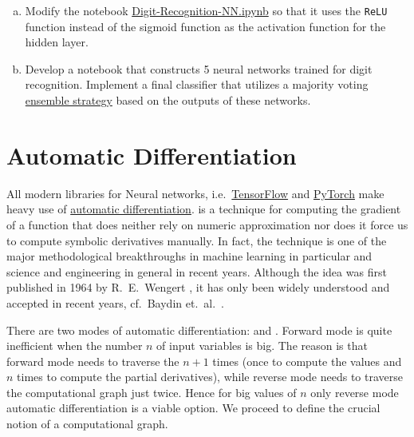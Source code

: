 \exercise
\begin{enumerate}[(a)]
\item Modify the notebook
      \href{https://github.com/karlstroetmann/Artificial-Intelligence/blob/master/Python/7%20Neural%20Networks/Digit-Recognition-NN.ipynb}{Digit-Recognition-NN.ipynb}
        so that it uses the \texttt{ReLU} function instead of the sigmoid function as the activation function for the
        hidden layer.
\item Develop a notebook that constructs 5 neural networks trained for digit recognition. Implement a final
      classifier that utilizes a majority voting
      \href{https://en.wikipedia.org/wiki/Ensemble_learning}{ensemble strategy}  based on the outputs of these networks. 
\end{enumerate}

\section{Automatic Differentiation}
All modern libraries for Neural networks, i.e.~\href{https://www.tensorflow.org}{TensorFlow} and
\href{https://pytorch.org}{PyTorch} make heavy use of
\href{https://en.wikipedia.org/wiki/Automatic_differentiation}{automatic differentiation}.
 is a technique for computing the gradient of a function that does neither rely
on numeric approximation nor does it force us to compute symbolic derivatives manually.  In fact, the technique
is one of the major methodological breakthroughs in machine learning in particular and science and engineering
in general in recent years.  Although the idea was first published in 1964 by R.~E.~Wengert \cite{wengert:1964},
it has only been widely understood and accepted in recent years, cf.~Baydin et.~al.~\cite{baydin:2018}.

There are two modes of automatic differentiation:   and .  Forward
mode is quite inefficient when the number $n$ of input variables is big.  The reason is that forward mode needs
to traverse the  $n+1$ times (once to compute the values and $n$ times to compute the
partial derivatives), while reverse mode needs to traverse the computational graph just twice.  Hence for big
values of $n$ only reverse mode automatic differentiation is a viable option.  We proceed to define the crucial
notion of a computational graph. 

